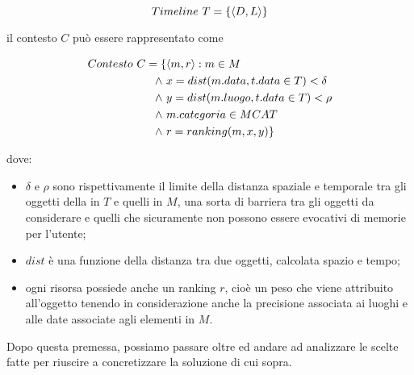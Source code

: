 \documentclass[sigproc-sp.tex]{subfiles}
\begin{document}
\begin{equation}
Timeline \ T = \{\langle D,L\rangle\}
\notag
\end{equation}

il contesto $C$  può essere rappresentato come

\begin{equation}
\begin{split}
Contesto \ C =  \{&\langle m,r\rangle : m \in M\\
\wedge \ &x = dist ( m.data,t.data \in T ) < \delta\\
\wedge \ &y = dist ( m.luogo,t.data \in T ) < \rho\\
\wedge \ &m.categoria \in MCAT\\
\wedge \ &r = ranking ( m,x,y ) \}
\end{split}
\notag
\end{equation}

dove:
\begin{itemize}
\item $\delta$ e $\rho$ sono rispettivamente il limite della distanza spaziale e temporale tra gli oggetti della in $T$ e quelli in $M$, una sorta di barriera tra gli oggetti da considerare e quelli che sicuramente non possono essere evocativi di memorie per l'utente;
\item $dist$ è una funzione della distanza tra due oggetti, calcolata spazio e tempo;
\item ogni risorsa possiede anche un ranking $r$, cioè un peso che viene attribuito all'oggetto tenendo in considerazione anche la precisione associata ai luoghi e alle date associate agli elementi in $M$.
\end{itemize}

Dopo questa premessa, possiamo passare oltre ed andare ad analizzare le scelte fatte per riuscire a concretizzare la soluzione di cui sopra.
\end{document}
